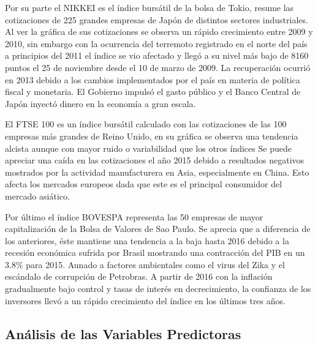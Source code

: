 \documentclass[a4paper,12pt]{Latex/Classes/PhDthesisPSnPDF}
\begin{document}
Por su parte el NIKKEI es el índice bursátil de la bolsa de Tokio, resume las cotizaciones de 225 grandes empresas de Japón de distintos sectores industriales. Al ver la gráfica de sus cotizaciones se observa un rápido crecimiento entre 2009 y 2010, sin embargo con la ocurrencia del terremoto registrado en el norte del país a principios del 2011 el índice se vio afectado y llegó a su nivel más bajo de 8160 puntos el 25 de noviembre desde el 10 de marzo de 2009. La recuperación ocurrió en 2013 debido a los cambios implementados por el país en materia de política fiscal y monetaria. El Gobierno impulsó el gasto público y el Banco Central de Japón inyectó dinero en la economía a gran escala.

El FTSE 100 es un índice bursátil calculado con las cotizaciones de las 100 empresas más grandes de Reino Unido, en su gráfica se observa una tendencia alcista aunque con mayor ruido o variabilidad que los otros índices Se puede apreciar una caída en las cotizaciones el año 2015 debido a resultados negativos mostrados por la actividad manufacturera en Asia, especialmente en China. Esto afecta los mercados europeos dada que este es el principal consumidor del mercado asiático.

Por último el índice BOVESPA representa las 50 empresas de mayor capitalización de la Bolsa de Valores de Sao Paulo. Se aprecia que a diferencia de los anteriores, éste mantiene una tendencia a la baja hasta 2016 debido a la recesión económica sufrida por Brasil mostrando una contracción del PIB en un 3.8\% para 2015. Aunado a factores ambientales como el virus del Zika y el escándalo de corrupción de Petrobras. A partir de 2016 con la inflación gradualmente bajo control y tasas de interés en decrecimiento, la confianza de los inversores llevó a un rápido crecimiento del índice en los últimos tres años.

\subsection{Análisis de las Variables Predictoras}
\end{document}
